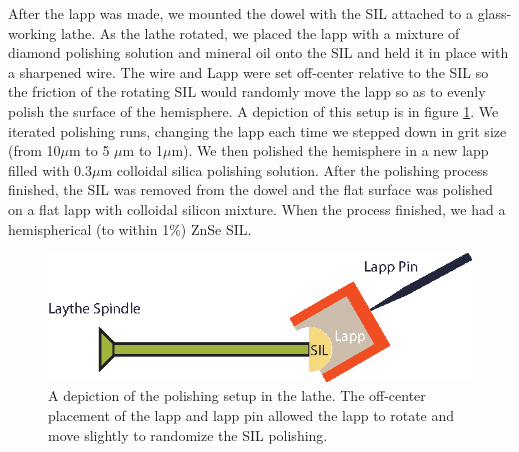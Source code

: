 \indent After the lapp was made, we mounted the dowel with the SIL attached to a glass-working lathe. As the lathe rotated, we placed the lapp with a mixture of diamond polishing solution and mineral oil onto the SIL and held it in place with a sharpened wire. The wire and Lapp were set off-center relative to the SIL so the friction of the rotating SIL would randomly move the lapp so as to evenly polish the surface of the hemisphere. A depiction of this setup is in figure \ref{polish}. We iterated polishing runs, changing the lapp each time we stepped down in grit size (from 10$\mu$m to 5 $\mu$m to 1$\mu$m). We then polished the hemisphere in a new lapp filled with 0.3$\mu$m colloidal silica polishing solution. After the polishing process finished, the SIL was removed from the dowel and the flat surface was polished on a flat lapp with colloidal silicon mixture. When the process finished, we had a hemispherical (to within 1\%) ZnSe SIL.

\begin{figure}[h!]
\centering
\includegraphics[width = .8\textwidth]{lathe.eps}
\caption{ \doublespacing A depiction of the polishing setup in the lathe. The off-center placement of the lapp and lapp pin allowed the lapp to rotate and move slightly to randomize the SIL polishing.}
\label{polish}
\end{figure}

